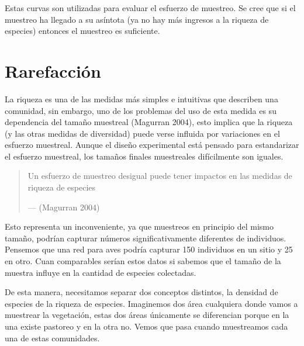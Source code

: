 \documentclass[]{book}
\begin{document}
Estas curvas son utilizadas para evaluar el esfuerzo de muestreo. Se
cree que si el muestreo ha llegado a su asíntota (ya no hay más ingresos
a la riqueza de especies) entonces el muestreo es suficiente.

\chapter{Rarefacción}\label{rarefaccion}

La riqueza es una de las medidas más simples e intuitivas que describen
una comunidad, sin embargo, uno de los problemas del uso de esta medida
es su dependencia del tamaño muestreal (Magurran 2004), esto implica que
la riqueza (y las otras medidas de diversidad) puede verse influida por
variaciones en el esfuerzo muestreal. Aunque el diseño experimental está
pensado para estandarizar el esfuerzo muestreal, los tamaños finales
muestreales difícilmente son iguales.

\begin{quote}
Un esfuerzo de muestreo desigual puede tener impactos en las medidas de
riqueza de especies

--- (Magurran 2004)
\end{quote}

Esto representa un inconveniente, ya que muestreos en principio del
mismo tamaño, podrían capturar números significativamente diferentes de
individuos. Pensemos que una red para aves podría capturar 150
individuos en un sitio y 25 en otro. Cuan comparables serían estos datos
si sabemos que el tamaño de la muestra influye en la cantidad de
especies colectadas.

De esta manera, necesitamos separar dos conceptos distintos, la densidad
de especies de la riqueza de especies. Imaginemos dos área cualquiera
donde vamos a muestrear la vegetación, estas dos áreas únicamente se
diferencian porque en la una existe pastoreo y en la otra no. Vemos que
pasa cuando muestreamos cada una de estas comunidades.
\end{document}
